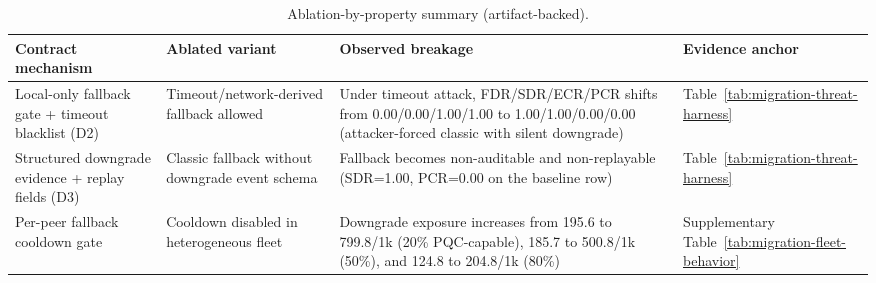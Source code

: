 \begin{table}[!tbp]
\centering
\scriptsize
\caption{Ablation-by-property summary (artifact-backed).}
\label{tab:ablation-by-property}
\begin{tabular}{@{}
  >{\raggedright\arraybackslash}p{}
  >{\raggedright\arraybackslash}p{}
  >{\raggedright\arraybackslash}p{}
  >{\raggedright\arraybackslash}p{}@{}}
\toprule
Contract mechanism & Ablated variant & Observed breakage & Evidence anchor \\
\midrule
Local-only fallback gate + timeout blacklist (D2) & Timeout/network-derived fallback allowed & Under timeout attack, FDR/SDR/ECR/PCR shifts from 0.00/0.00/1.00/1.00 to 1.00/1.00/0.00/0.00 (attacker-forced classic with silent downgrade) & Table~\ref{tab:migration-threat-harness} \\
Structured downgrade evidence + replay fields (D3) & Classic fallback without downgrade event schema & Fallback becomes non-auditable and non-replayable (SDR=1.00, PCR=0.00 on the baseline row) & Table~\ref{tab:migration-threat-harness} \\
Per-peer fallback cooldown gate & Cooldown disabled in heterogeneous fleet & Downgrade exposure increases from 195.6 to 799.8/1k (20\% PQC-capable), 185.7 to 500.8/1k (50\%), and 124.8 to 204.8/1k (80\%) & Supplementary Table~\ref{tab:migration-fleet-behavior} \\
\bottomrule
\end{tabular}
\end{table}

